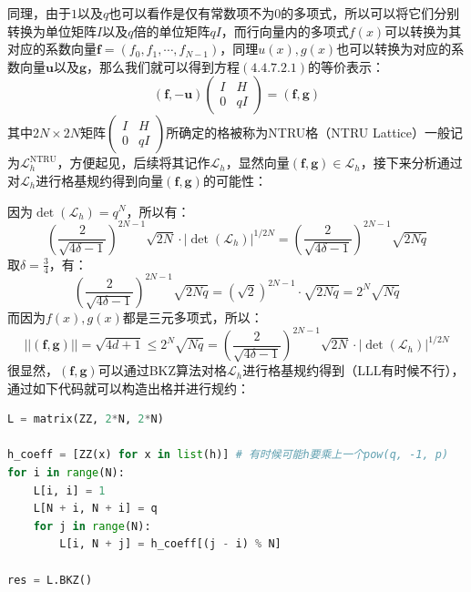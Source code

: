 \documentclass{book}
\numberwithin{equation}{subsubsection}
\begin{document}
同理，由于$1$以及$q$也可以看作是仅有常数项不为$0$的多项式，所以可以将它们分别转换为单位矩阵$I$以及$q$倍的单位矩阵$qI$，而行向量内的多项式$f(x)$可以转换为其对应的系数向量$\pmb{f}=(f_0,f_1,\cdots,f_{N-1})$，同理$u(x),g(x)$也可以转换为对应的系数向量$\pmb{u}$以及$\pmb{g}$，那么我们就可以得到方程$(4.4.7.2.1)$的等价表示：
\begin{equation}
    (\pmb{f},-\pmb{u})
    \left(\begin{matrix}
        I&H\\
        0&qI
    \end{matrix}\right)=(\pmb{f},\pmb{g})
    \nonumber
\end{equation}
其中$2N\times2N$矩阵$\left(\begin{matrix}I&H\\0&qI\end{matrix}\right)$所确定的格被称为NTRU格（NTRU Lattice）一般记为$\mathcal{L}_h^{\text{NTRU}}$，方便起见，后续将其记作$\mathcal{L}_h$，显然向量$(\pmb{f},\pmb{g})\in\mathcal{L}_h$，接下来分析通过对$\mathcal{L}_h$进行格基规约得到向量$(\pmb{f},\pmb{g})$的可能性：\par
因为$\det(\mathcal{L}_h)=q^N$，所以有：
\begin{equation}
    \left(\frac{2}{\sqrt{4\delta-1}}\right)^{2N-1}\sqrt{2N}\cdot|\det(\mathcal{L}_h)|^{1/2N}=\left(\frac{2}{\sqrt{4\delta-1}}\right)^{2N-1}\sqrt{2Nq}
    \nonumber
\end{equation}
取$\delta=\frac{3}{4}$，有：
\begin{equation}
    \left(\frac{2}{\sqrt{4\delta-1}}\right)^{2N-1}\sqrt{2Nq}=(\sqrt{2})^{2N-1}\cdot\sqrt{2Nq}=2^N\sqrt{Nq}
    \nonumber
\end{equation}
而因为$f(x),g(x)$都是三元多项式，所以：
\begin{equation}
    ||(\pmb{f},\pmb{g})||=\sqrt{4d+1}\le2^N\sqrt{Nq}=\left(\frac{2}{\sqrt{4\delta-1}}\right)^{2N-1}\sqrt{2N}\cdot|\det(\mathcal{L}_h)|^{1/2N}
    \nonumber
\end{equation}
很显然，$(\pmb{f},\pmb{g})$可以通过BKZ算法对格$\mathcal{L}_h$进行格基规约得到（LLL有时候不行），通过如下代码就可以构造出格并进行规约：
\begin{lstlisting}[language=Python,basicstyle=\ttfamily,breaklines=true,keywordstyle=\bfseries\color{blue}]
L = matrix(ZZ, 2*N, 2*N)

h_coeff = [ZZ(x) for x in list(h)] # 有时候可能h要乘上一个pow(q, -1, p)
for i in range(N):
    L[i, i] = 1
    L[N + i, N + i] = q
    for j in range(N):
        L[i, N + j] = h_coeff[(j - i) % N]

res = L.BKZ()
\end{lstlisting}
\end{document}
